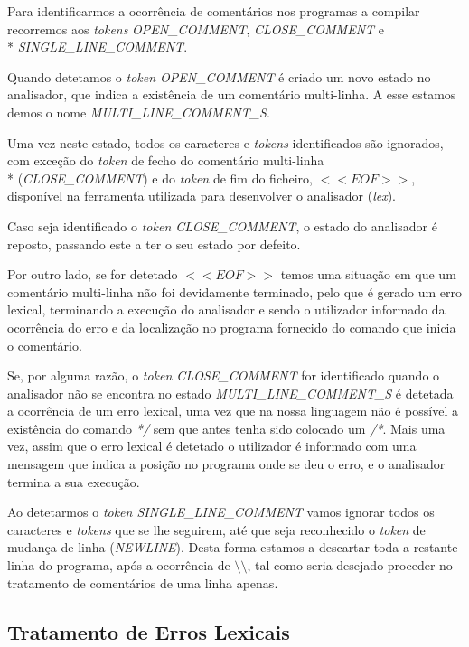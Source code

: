 \documentclass[11pt,a4paper]{article}
\begin{document}
	Para identificarmos a ocorrência de comentários nos programas a compilar recorremos aos \emph{tokens} \emph{OPEN\_COMMENT}, \emph{CLOSE\_COMMENT} e \\* \emph{SINGLE\_LINE\_COMMENT}.
	
	Quando detetamos o \emph{token OPEN\_COMMENT} é criado um novo estado no analisador, que indica a existência de um comentário multi-linha. A esse estamos demos o nome \emph{MULTI\_LINE\_COMMENT\_S}.
	
	Uma vez neste estado, todos os caracteres e \emph{tokens} identificados são ignorados, com exceção do \emph{token} de fecho do comentário multi-linha \\* (\emph{CLOSE\_COMMENT}) e do \emph{token} de fim do ficheiro, $<<EOF>>$, disponível na ferramenta utilizada para desenvolver o analisador (\emph{lex}).
	
	Caso seja identificado o \emph{token CLOSE\_COMMENT}, o estado do analisador é reposto, passando este a ter o seu estado por defeito.
	
	Por outro lado, se for detetado $<<EOF>>$ temos uma situação em que um comentário multi-linha não foi devidamente terminado, pelo que é gerado um erro lexical, terminando a execução do analisador e sendo o utilizador informado da ocorrência do erro e da localização no programa fornecido do comando que inicia o comentário.
	
	Se, por alguma razão, o \emph{token CLOSE\_COMMENT} for identificado quando o analisador não se encontra no estado \emph{MULTI\_LINE\_COMMENT\_S} é detetada a ocorrência de um erro lexical, uma vez que na nossa linguagem não é possível a existência do comando \emph{*/} sem que antes tenha sido colocado um \emph{/*}. Mais uma vez, assim que o erro lexical é detetado o utilizador é informado com uma mensagem que indica a posição no programa onde se deu o erro, e o analisador termina a sua execução.
	
	Ao detetarmos o \emph{token SINGLE\_LINE\_COMMENT} vamos ignorar todos os caracteres e \emph{tokens} que se lhe seguirem, até que seja reconhecido o \emph{token} de mudança de linha (\emph{NEWLINE}). Desta forma estamos a descartar toda a restante linha do programa, após a ocorrência de $\setminus \setminus$, tal como seria desejado proceder no tratamento de comentários de uma linha apenas.
	
	\subsection{Tratamento de Erros Lexicais}
	
\end{document}
